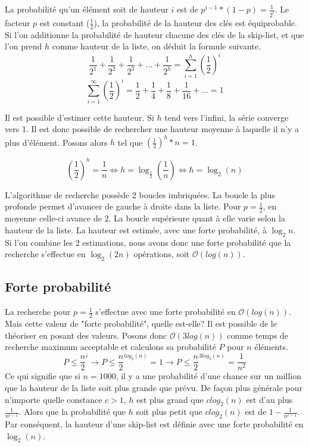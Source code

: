 \documentclass[hidelinks,a4paper, 12pt]{article}
\begin{document}
	\newpage
	La probabilité qu'un élément soit de hauteur $i$ est de ${p^{i-1}*(1-p)} = \frac{1}{2^{i}} $. Le facteur $p$ est constant ($\frac{1}{2}$), la probabilité de la hauteur des clés est équiprobable. Si l'on additionne la probabilité de hauteur chacune des clés de la skip-list, et que l'on prend $h$ comme hauteur de la liste, on déduit la formule suivante.
	\[
		\frac{1}{{2}^{1}}+\frac{1}{{2}^{2}}+\frac{1}{{2}^{3}}+\dots+\frac{1}{{2}^{h}}
		= \sum _{i=1}^{h} ({\frac{1}{2}})^{i}
	\]
	\[
		\sum _{i=1}^{\infty} ({\frac{1}{2}})^{i} = \frac{1}{2} + \frac{1}{4} + \frac{1}{8} + \frac{1}{16} + ... = 1
	\]
	
	Il est possible d'estimer cette hauteur. Si $h$ tend vers l'infini, la série converge vers 1. Il est donc possible de rechercher une hauteur moyenne à laquelle il n'y a plus d'élément. Posons alors $h$ tel que ${(\frac{1}{2})}^h*n = 1$. 

	\[
		{(\frac{1}{2})}^{h}=\frac{1}{n}
		\iff h = \log_{\frac{1}{2}}(\frac{1}{n})
		\iff h = \log_{2}(n)
	\]
	
	L'algorithme de recherche possède 2 boucles imbriquées. La boucle la plus profonde permet d'avancer de gauche à droite dans la liste. Pour $p=\frac{1}{2}$, en moyenne celle-ci avance de $2$. La boucle supérieure quant à elle varie selon la hauteur de la liste. La hauteur est estimée, avec une forte probabilité, à $\log_{2} n $. Si l'on combine les 2 estimations, nous avons donc une forte probabilité que la recherche s'effectue en $\log_{2}( 2n )$ opérations, soit $\mathcal{O}(log(n))$.
	
	\subsection{Forte probabilité}
	La recherche pour $p=\frac{1}{2}$ s'effectue avec une forte probabilité en $\mathcal{O}(log(n))$. Mais cette valeur de "forte probabilité", quelle est-elle? Il est possible de le théoriser en posant des valeurs. Posons donc $\mathcal{O}(3log(n))$ comme temps de recherche maximum acceptable et calculons sa probabilité $P$ pour $n$ éléments.
	\[
		P \le {\frac{n}{2}}^{i}
		\longrightarrow P \le {\frac{n}{2}}^{log_2(n)} = 1
		\longrightarrow P \le {\frac{n}{2}}^{3log_2(n)} = \frac{1}{n^2}
	\]
	Ce qui signifie que si $n=1000$, il y a une probabilité d'une chance sur un million que la hauteur de la liste soit plus grande que prévu. De façon plus générale pour n'importe quelle constance $c>1$, $h$ est plus grand que $c log_2(n)$ est d'au plus $\frac{1}{n^{c-1}}$. Alors que la probabilité que  $h$ soit plus petit que $c log_2(n)$ est de $1-\frac{1}{n^{c-1}}$. Par conséquent, la hauteur d'une skip-list est définie avec une forte probabilité en $\log_{2}(n)$.
	
\end{document}

